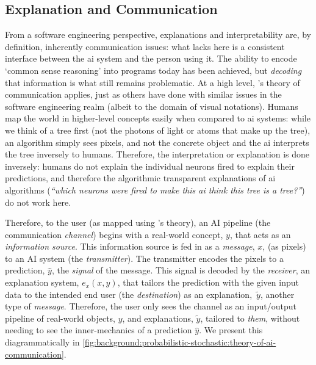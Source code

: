 \subsection{Explanation and Communication}
\label{ssec:background:probabilistic-stochastic:communication}

From a software engineering perspective, explanations and interpretability are, by definition, inherently communication issues: what lacks here is a consistent interface between the \gls{ai} system and the person using it. The ability to encode `common sense reasoning' \citep{McCarthy:1960:PCS:889202} into programs today has been achieved, but \textit{decoding} that information is what still remains problematic. At a high level, \citeauthor{Shannon:1963ti}'s theory of communication \citep{Shannon:1963ti} applies, just as others have done with similar issues in the software engineering realm \citep{Moody:2009vo,Wickham:2010hy} (albeit to the domain of visual notations). Humans map the world in higher-level concepts easily when compared to \gls{ai} systems: while we think of a tree first (not the photons of light or atoms that make up the tree), an algorithm simply sees pixels, and not the concrete object \citep{DoshiVelez:2017vm} and the \gls{ai} interprets the tree inversely to humans. Therefore, the interpretation or explanation is done inversely: humans do not explain the individual neurons fired to explain their predictions, and therefore the algorithmic transparent explanations of \gls{ai} algorithms (\textit{``which neurons were fired to make this \gls{ai} think this tree is a tree?''}) do not work here.

Therefore, to the user (as mapped using \citeauthor{Shannon:1963ti}'s theory), an AI pipeline (the communication \textit{channel}) begins with a real-world concept, $y$, that acts as an \textit{information source}. This information source is fed in as a \textit{message}, $x$, (as pixels) to an AI system (the \textit{transmitter}). The transmitter encodes the pixels to a prediction, $\hat{y}$, the \textit{signal} of the message. This signal is decoded by the \textit{receiver}, an explanation system, $e_{x}(x,\hat{y})$, that tailors the prediction with the given input data to the intended end user (the \textit{destination}) as an explanation,~$\tilde{y}$, another type of \textit{message}. Therefore, the user only sees the channel as an input/output pipeline of real-world objects, $y$, and explanations, $\tilde{y}$, tailored to \textit{them}, without needing to see the inner-mechanics of a prediction $\hat{y}$. We present this diagrammatically in \cref{fig:background:probabilistic-stochastic:theory-of-ai-communication}.


